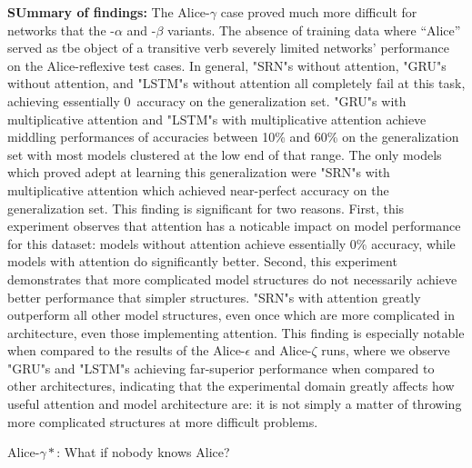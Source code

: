 {\bf SUmmary of findings:} The Alice-$\gamma$ case proved much more difficult
for networks that the -$\alpha$ and -$\beta$ variants. The absence of training
data where ``Alice'' served as tbe object of a transitive verb severely limited
networks' performance on the Alice-reflexive test cases. In general, "SRN"s without attention, "GRU"s without attention, and "LSTM"s without attention
all completely fail at this task, achieving essentially 0\ accuracy on the 
generalization set. "GRU"s with multiplicative attention and "LSTM"s with
multiplicative attention achieve middling performances of accuracies between
10\% and 60\% on the generalization set with most models clustered at the low
end of that range. The only models which proved adept at learning this 
generalization were "SRN"s with multiplicative attention which achieved 
near-perfect accuracy on the generalization set. This finding is significant
for two reasons. First, this experiment observes that attention has a noticable
impact on model performance for this dataset: models without attention achieve
essentially 0\% accuracy, while models with attention do significantly better.
Second, this experiment demonstrates that more complicated model structures
do not necessarily achieve better performance that simpler structures. 
"SRN"s with attention greatly outperform all other model structures, even
once which are more complicated in architecture, even those implementing 
attention. This finding is especially notable when compared to the results of
the Alice-$\epsilon$ and Alice-$\zeta$ runs, where we observe "GRU"s and 
"LSTM"s achieving far-superior performance when compared to other 
architectures, indicating that the experimental domain greatly affects how 
useful attention and model architecture are: it is not simply a matter of 
throwing more complicated structures at more difficult problems.



\ssec Alice-$\gamma*$: What if nobody knows Alice?

